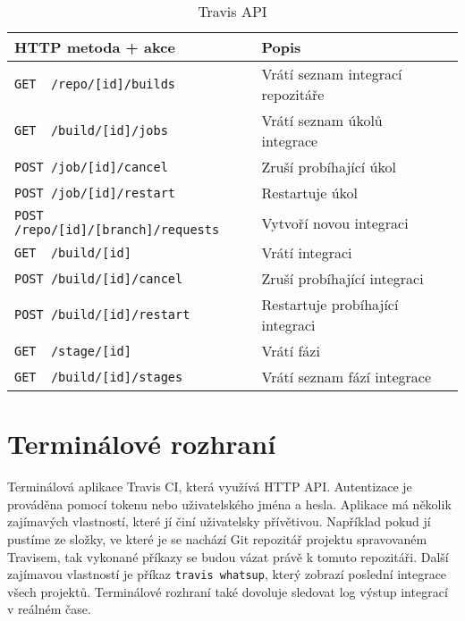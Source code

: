 \begin{table}[ht]
\centering
\fontsize{9.5}{11.5}\selectfont
\caption{Travis API}
\label{table:gitlab-api}
\begin{tabular}{|l|l|l|}
\hline
HTTP metoda + akce                                          & Popis \\ \hline
\verb|GET  /repo/[id]/builds|                               & Vrátí seznam integrací repozitáře      \\ \hline
\verb|GET  /build/[id]/jobs|                                & Vrátí seznam úkolů integrace      \\ \hline
\verb|POST /job/[id]/cancel|                                & Zruší probíhající úkol      \\ \hline
\verb|POST /job/[id]/restart|                               & Restartuje úkol      \\ \hline
\verb|POST /repo/[id]/[branch]/requests|                    & Vytvoří novou integraci      \\ \hline
\verb|GET  /build/[id]|                                     & Vrátí integraci      \\ \hline
\verb|POST /build/[id]/cancel|                              & Zruší probíhající integraci      \\ \hline
\verb|POST /build/[id]/restart|                             & Restartuje probíhající integraci      \\ \hline
\verb|GET  /stage/[id]|                                     & Vrátí fázi      \\ \hline
\verb|GET  /build/[id]/stages|                              & Vrátí seznam fází integrace      \\ \hline
\end{tabular}
\end{table}

\section{Terminálové rozhraní}

Terminálová aplikace Travis CI, která využívá HTTP API.
Autentizace je prováděna pomocí tokenu nebo uživatelského jména a hesla.
Aplikace má několik zajímavých vlastností, které jí činí uživatelsky přívětivou.
Například pokud jí pustíme ze složky, ve které je se nachází Git repozitář projektu spravovaném Travisem, tak vykonané příkazy se budou vázat právě k tomuto repozitáři.
Další zajímavou vlastností je příkaz \verb|travis whatsup|, který zobrazí poslední integrace všech projektů.
Terminálové rozhraní také dovoluje sledovat log výstup integrací v reálném čase. 

